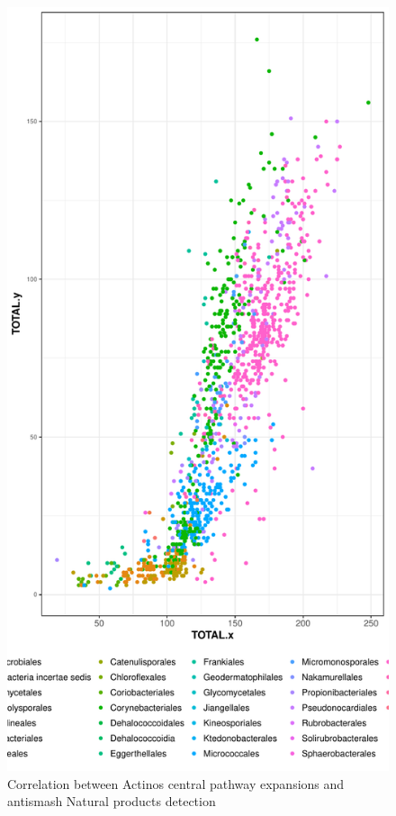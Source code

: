 \documentclass[12pt,twoside]{reedthesis}
\begin{document}
  \begin{figure}[h!tbp]
  \centering
  \includegraphics[angle = 0,scale = 0.5]{chapter2/Actinobacteria/ActinosSMASHvsExpansionsbyOrder.pdf}
  \caption[Correlation between Actinos central pathway expansions and antismash Natural products detection]{\normalsize{Correlation between Actinos central pathway expansions and antismash Natural products detection}}
  \label{fig:ActinosSMASHvsExpansionsbyOrder}
  \end{figure}
  
\end{document}
